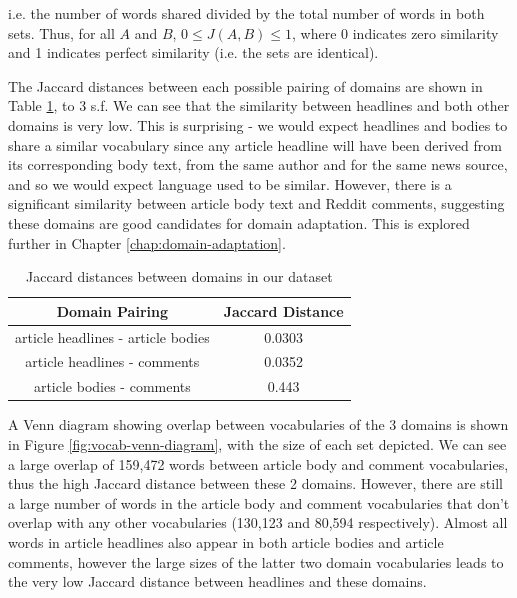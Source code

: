 i.e. the number of words shared divided by the total number of words in both sets. Thus, for all $ A $ and $ B $,  $ 0 \leq J(A, B) \leq 1 $, where 0 indicates zero similarity and 1 indicates perfect similarity (i.e. the sets are identical).

The Jaccard distances between each possible pairing of domains are shown in Table \ref{tab:jaccard-distances}, to 3 s.f. We can see that the similarity between headlines and both other domains is very low. This is surprising - we would expect headlines and bodies to share a similar vocabulary since any article headline will have been derived from its corresponding body text, from the same author and for the same news source, and so we would expect language used to be similar. However, there is a significant similarity between article body text and Reddit comments, suggesting these domains are good candidates for domain adaptation. This is explored further in Chapter \ref{chap:domain-adaptation}.

\begin{table}[ht]
    \centering
    \begin{tabular}{|c|c|}
        \hline
        \textbf{Domain Pairing} & \textbf{Jaccard Distance} \\
        \hline
        article headlines - article bodies & 0.0303 \\
        article headlines - comments & 0.0352 \\
        article bodies - comments & 0.443 \\
        \hline
    \end{tabular}
    \caption{Jaccard distances between domains in our dataset}
    \label{tab:jaccard-distances}
\end{table}

A Venn diagram showing overlap between vocabularies of the 3 domains is shown in Figure \ref{fig:vocab-venn-diagram}, with the size of each set depicted. We can see a large overlap of 159,472 words between article body and comment vocabularies, thus the high Jaccard distance between these 2 domains. However, there are still a large number of words in the article body and comment vocabularies that don't overlap with any other vocabularies (130,123 and 80,594 respectively). Almost all words in article headlines also appear in both article bodies and article comments, however the large sizes of the latter two domain vocabularies leads to the very low Jaccard distance between headlines and these domains.

